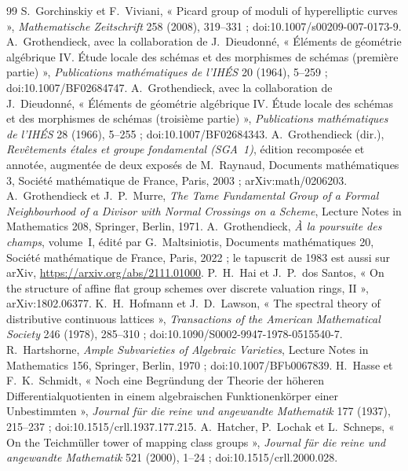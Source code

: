 \documentclass[11pt]{article}
\theoremstyle{plain}
\theoremstyle{definition}
\theoremstyle{plain}
\theoremstyle{definition}
\theoremstyle{remark}
\renewcommand{\_}{\bkunderscore\allowbreak}
\begin{document}
\begin{thebibliography}{99}
 S.~Gorchinskiy et F.~Viviani, « Picard group of moduli of hyperelliptic curves », \emph{Mathematische Zeitschrift} 258 (2008), 319--331 ; doi:10.1007/s00209-007-0173-9.
 A.~Grothendieck, avec la collaboration de J.~Dieudonné, « Éléments de géométrie algébrique IV. Étude locale des schémas et des morphismes de schémas (première partie) », \emph{Publications mathématiques de l'IHÉS} 20 (1964), 5--259 ; doi:10.1007/BF02684747.
 A.~Grothendieck, avec la collaboration de J.~Dieudonné, « Éléments de géométrie algébrique IV. Étude locale des schémas et des morphismes de schémas (troisième partie) », \emph{Publications mathématiques de l'IHÉS} 28 (1966), 5--255 ; doi:10.1007/BF02684343.
 A.~Grothendieck (dir.), \emph{Revêtements étales et groupe fondamental (SGA~1)}, édition recomposée et annotée, augmentée de deux exposés de M.~Raynaud, Documents mathématiques 3, Société mathématique de France, Paris, 2003 ; arXiv:math/0206203.
 A.~Grothendieck et J.~P.~Murre, \emph{The Tame Fundamental Group of a Formal Neighbourhood of a Divisor with Normal Crossings on a Scheme}, Lecture Notes in Mathematics 208, Springer, Berlin, 1971.
 A.~Grothendieck, \emph{À la poursuite des champs}, volume~I, édité par G.~Maltsiniotis, Documents mathématiques 20, Société mathématique de France, Paris, 2022 ; le tapuscrit de 1983 est aussi sur arXiv, \url{https://arxiv.org/abs/2111.01000}.
 P.~H.~Hai et J.~P.~dos Santos, « On the structure of affine flat group schemes over discrete valuation rings, II », arXiv:1802.06377.
 K.~H.~Hofmann et J.~D.~Lawson, « The spectral theory of distributive continuous lattices », \emph{Transactions of the American Mathematical Society} 246 (1978), 285--310 ; doi:10.1090/S0002-9947-1978-0515540-7.
 R.~Hartshorne, \emph{Ample Subvarieties of Algebraic Varieties}, Lecture Notes in Mathematics 156, Springer, Berlin, 1970 ; doi:10.1007/BFb0067839.
 H.~Hasse et F.~K.~Schmidt, « Noch eine Begründung der Theorie der höheren Differentialquotienten in einem algebraischen Funktionenkörper einer Unbestimmten », \emph{Journal für die reine und angewandte Mathematik} 177 (1937), 215--237 ; doi:10.1515/crll.1937.177.215.
 A.~Hatcher, P.~Lochak et L.~Schneps, « On the Teichmüller tower of mapping class groups », \emph{Journal für die reine und angewandte Mathematik} 521 (2000), 1--24 ; doi:10.1515/crll.2000.028.

\end{thebibliography}
\end{document}
